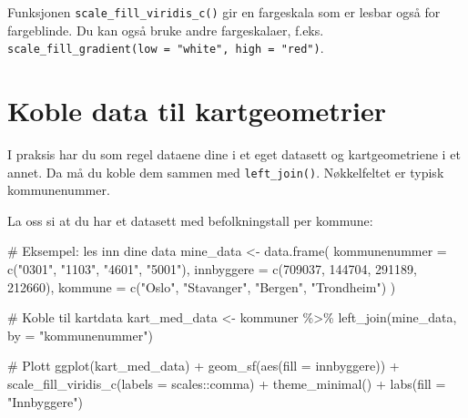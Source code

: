 \documentclass[
  norsk,
  letterpaper,
  DIV=11,
  numbers=noendperiod]{scrreprt}
\newenvironment{Shaded}{\begin{snugshade}}{\end{snugshade}}
\newcommand{\AttributeTok}[1]{\textcolor[rgb]{0.40,0.45,0.13}{#1}}
\newcommand{\CommentTok}[1]{\textcolor[rgb]{0.37,0.37,0.37}{#1}}
\newcommand{\DecValTok}[1]{\textcolor[rgb]{0.68,0.00,0.00}{#1}}
\newcommand{\FunctionTok}[1]{\textcolor[rgb]{0.28,0.35,0.67}{#1}}
\newcommand{\NormalTok}[1]{\textcolor[rgb]{0.00,0.23,0.31}{#1}}
\newcommand{\OtherTok}[1]{\textcolor[rgb]{0.00,0.23,0.31}{#1}}
\newcommand{\SpecialCharTok}[1]{\textcolor[rgb]{0.37,0.37,0.37}{#1}}
\newcommand{\StringTok}[1]{\textcolor[rgb]{0.13,0.47,0.30}{#1}}
\theoremstyle{definition}
\theoremstyle{remark}
\begin{document}
Funksjonen \texttt{scale\_fill\_viridis\_c()} gir en fargeskala som er
lesbar også for fargeblinde. Du kan også bruke andre fargeskalaer,
f.eks. \texttt{scale\_fill\_gradient(low\ =\ "white",\ high\ =\ "red")}.

\section{Koble data til
kartgeometrier}\label{koble-data-til-kartgeometrier}

I praksis har du som regel dataene dine i et eget datasett og
kartgeometriene i et annet. Da må du koble dem sammen med
\texttt{left\_join()}. Nøkkelfeltet er typisk kommunenummer.

La oss si at du har et datasett med befolkningstall per kommune:

\begin{Shaded}
\begin{Highlighting}[]
\CommentTok{\# Eksempel: les inn dine data}
\NormalTok{mine\_data }\OtherTok{\textless{}{-}} \FunctionTok{data.frame}\NormalTok{(}
  \AttributeTok{kommunenummer =} \FunctionTok{c}\NormalTok{(}\StringTok{"0301"}\NormalTok{, }\StringTok{"1103"}\NormalTok{, }\StringTok{"4601"}\NormalTok{, }\StringTok{"5001"}\NormalTok{),}
  \AttributeTok{innbyggere =} \FunctionTok{c}\NormalTok{(}\DecValTok{709037}\NormalTok{, }\DecValTok{144704}\NormalTok{, }\DecValTok{291189}\NormalTok{, }\DecValTok{212660}\NormalTok{),}
  \AttributeTok{kommune =} \FunctionTok{c}\NormalTok{(}\StringTok{"Oslo"}\NormalTok{, }\StringTok{"Stavanger"}\NormalTok{, }\StringTok{"Bergen"}\NormalTok{, }\StringTok{"Trondheim"}\NormalTok{)}
\NormalTok{)}

\CommentTok{\# Koble til kartdata}
\NormalTok{kart\_med\_data }\OtherTok{\textless{}{-}}\NormalTok{ kommuner }\SpecialCharTok{\%\textgreater{}\%}
  \FunctionTok{left\_join}\NormalTok{(mine\_data, }\AttributeTok{by =} \StringTok{"kommunenummer"}\NormalTok{)}

\CommentTok{\# Plott}
\FunctionTok{ggplot}\NormalTok{(kart\_med\_data) }\SpecialCharTok{+}
  \FunctionTok{geom\_sf}\NormalTok{(}\FunctionTok{aes}\NormalTok{(}\AttributeTok{fill =}\NormalTok{ innbyggere)) }\SpecialCharTok{+}
  \FunctionTok{scale\_fill\_viridis\_c}\NormalTok{(}\AttributeTok{labels =}\NormalTok{ scales}\SpecialCharTok{::}\NormalTok{comma) }\SpecialCharTok{+}
  \FunctionTok{theme\_minimal}\NormalTok{() }\SpecialCharTok{+}
  \FunctionTok{labs}\NormalTok{(}\AttributeTok{fill =} \StringTok{"Innbyggere"}\NormalTok{)}
\end{Highlighting}
\end{Shaded}
\end{document}
